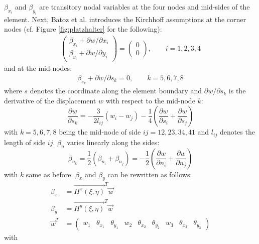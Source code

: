   $\beta_{x_i}$ and $\beta_{y_i}$ are transitory nodal variables at the four nodes and mid-sides of the element.
  Next, Batoz et al. introduces the Kirchhoff assumptions at the corner nodes (cf. Figure \ref{fig:platzhalter} for the following):
  \begin{align}
  \begin{pmatrix}
  \beta_{x_i} + \partial w/\partial x_i \\
  \beta_{y_i} + \partial w/\partial y_i
  \end{pmatrix} = \begin{pmatrix}
  0\\0
  \end{pmatrix},\qquad i = 1,2,3,4
  \end{align}
  and at the mid-nodes:
  \begin{align}
  \beta_{s_k} + \partial w/\partial s_k = 0,\qquad k = 5,6,7,8
  \end{align}
  where $s$ denotes the coordinate along the element boundary and $\partial w/\partial s_k$ is the derivative of the displacement $w$ with respect to the mid-node $k$:
  \begin{equation}
  \frac{\partial w}{\partial s_k} = -\frac{3}{2 l_{ij}}(w_i-w_j) - \frac{1}{4}\left(\frac{\partial w}{\partial s_i} + \frac{\partial w}{\partial s_j}\right)
  \end{equation}
  with $k = 5,6,7,8$ being the mid-node of side $ij = 12, 23, 34, 41$ and $l_{ij}$ denotes the length of side $ij$.
  $\beta_n$ varies linearly along the sides:
  \begin{equation}
  \beta_{n_k} = \frac{1}{2}\left(\beta_{n_i} + \beta_{n_j}\right) = -\frac{1}{2} \left(\frac{\partial w}{\partial n_i} + \frac{\partial w}{\partial n_j}\right)
  \end{equation}
  with $k$ same as before.
  $\beta_x$ and $\beta_y$ can be rewritten as follows:
  \begin{align}
  \beta_x &= \vec{H^x(\xi,\eta)}^T \vec{w}\\
  \beta_y &= \vec{H^y(\xi,\eta)}^T \vec{w}\\
  \vec{w}^T &= \begin{pmatrix}
  w_1&\theta_{x_1}&\theta_{y_1}&w_2&\theta_{x_2}&\theta_{y_2}&w_3&\theta_{x_3}&\theta_{y_3}
  \end{pmatrix} \nonumber
  \end{align}
  with
